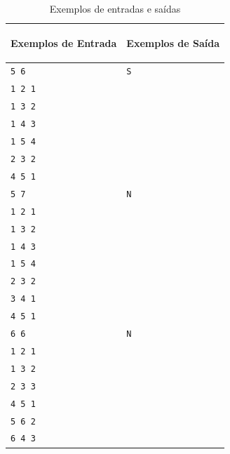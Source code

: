 {\tiny
\begin{table}[ht]
    \centering
    \begin{tabular}{|p{7cm}|p{7cm}|}
        \hline
        \begin{center}
            \vspace{-0.3cm}
            \textbf{Exemplos de Entrada}
            \vspace{-0.3cm}
        \end{center} 
         &  
        \begin{center}
            \vspace{-0.3cm}
            \textbf{Exemplos de Saída}
            \vspace{-0.3cm}
        \end{center} \\ \hline
         \texttt{5 6} & \texttt{S} \\  
         \texttt{1 2 1} & \texttt{} \\
         \texttt{1 3 2} & \texttt{} \\
         \texttt{1 4 3} & \texttt{} \\
         \texttt{1 5 4} & \texttt{} \\
         \texttt{2 3 2} & \texttt{} \\
         \texttt{4 5 1} & \texttt{} \\
         \hline
         \texttt{5 7} & \texttt{N} \\  
         \texttt{1 2 1} & \texttt{} \\
         \texttt{1 3 2} & \texttt{} \\
         \texttt{1 4 3} & \texttt{} \\
         \texttt{1 5 4} & \texttt{} \\
         \texttt{2 3 2} & \texttt{} \\
         \texttt{3 4 1} & \texttt{} \\
         \texttt{4 5 1} & \texttt{} \\
         \hline
         \texttt{6 6} & \texttt{N} \\  
         \texttt{1 2 1} & \texttt{} \\
         \texttt{1 3 2} & \texttt{} \\
         \texttt{2 3 3} & \texttt{} \\
         \texttt{4 5 1} & \texttt{} \\
         \texttt{5 6 2} & \texttt{} \\
         \texttt{6 4 3} & \texttt{} \\
        \hline
    \end{tabular}
    \caption{Exemplos de entradas e saídas}
    \label{tab:inputJ3}
\end{table}}

\newpage

\begin{center}
\noindent

\end{center}